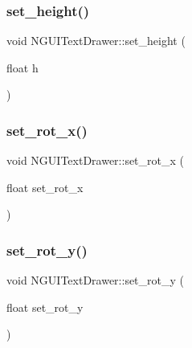 \hypertarget{class_n_g_u_i_text_drawer_a711f2daeefbfef436143e86809d9ebfc}{}\label{class_n_g_u_i_text_drawer_a711f2daeefbfef436143e86809d9ebfc} 
\subsubsection{\texorpdfstring{set\+\_\+height()}{set\_height()}}
{\footnotesize\ttfamily void N\+G\+U\+I\+Text\+Drawer\+::set\+\_\+height (\begin{DoxyParamCaption}\item[{float}]{h }\end{DoxyParamCaption})}

\hypertarget{class_n_g_u_i_text_drawer_a733f643f1fdd8fb77fdb8d085b238208}{}\label{class_n_g_u_i_text_drawer_a733f643f1fdd8fb77fdb8d085b238208} 
\subsubsection{\texorpdfstring{set\+\_\+rot\+\_\+x()}{set\_rot\_x()}}
{\footnotesize\ttfamily void N\+G\+U\+I\+Text\+Drawer\+::set\+\_\+rot\+\_\+x (\begin{DoxyParamCaption}\item[{float}]{set\+\_\+rot\+\_\+x }\end{DoxyParamCaption})}

\hypertarget{class_n_g_u_i_text_drawer_ab6f9dd2bd192e663d0a7eea2a38cc85d}{}\label{class_n_g_u_i_text_drawer_ab6f9dd2bd192e663d0a7eea2a38cc85d} 
\subsubsection{\texorpdfstring{set\+\_\+rot\+\_\+y()}{set\_rot\_y()}}
{\footnotesize\ttfamily void N\+G\+U\+I\+Text\+Drawer\+::set\+\_\+rot\+\_\+y (\begin{DoxyParamCaption}\item[{float}]{set\+\_\+rot\+\_\+y }\end{DoxyParamCaption})}

